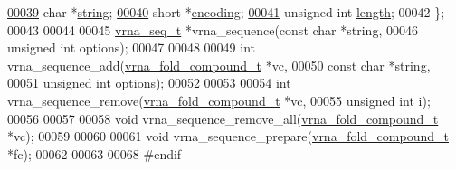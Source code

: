\begin{DoxyCode}
\hyperlink{group__alphabet__utils_aa885a2c52b3f87fb6c8f51a77a3430a7}{00039}   \textcolor{keywordtype}{char}            *\hyperlink{group__alphabet__utils_aa885a2c52b3f87fb6c8f51a77a3430a7}{string};    
\hyperlink{group__alphabet__utils_a8010ad82da6766e859e6f25e275a1d89}{00040}   \textcolor{keywordtype}{short}           *\hyperlink{group__alphabet__utils_a8010ad82da6766e859e6f25e275a1d89}{encoding};  
\hyperlink{group__alphabet__utils_af60876d93312ce0b842574a14c3a9cdd}{00041}   \textcolor{keywordtype}{unsigned} \textcolor{keywordtype}{int}    \hyperlink{group__alphabet__utils_af60876d93312ce0b842574a14c3a9cdd}{length};     
00042 \};
00043 
00044 
00045 \hyperlink{group__alphabet__utils_structvrna__sequence__s}{vrna\_seq\_t} *vrna\_sequence(\textcolor{keyword}{const} \textcolor{keywordtype}{char}    *\textcolor{keywordtype}{string},
00046                           \textcolor{keywordtype}{unsigned} \textcolor{keywordtype}{int}  options);
00047 
00048 
00049 \textcolor{keywordtype}{int}           vrna\_sequence\_add(\hyperlink{group__fold__compound_structvrna__fc__s}{vrna\_fold\_compound\_t}  *vc,
00050                                 \textcolor{keyword}{const} \textcolor{keywordtype}{char}            *\textcolor{keywordtype}{string},
00051                                 \textcolor{keywordtype}{unsigned} \textcolor{keywordtype}{int}          options);
00052 
00053 
00054 \textcolor{keywordtype}{int}           vrna\_sequence\_remove(\hyperlink{group__fold__compound_structvrna__fc__s}{vrna\_fold\_compound\_t} *vc,
00055                                    \textcolor{keywordtype}{unsigned} \textcolor{keywordtype}{int}         i);
00056 
00057 
00058 \textcolor{keywordtype}{void}          vrna\_sequence\_remove\_all(\hyperlink{group__fold__compound_structvrna__fc__s}{vrna\_fold\_compound\_t} *vc);
00059 
00060 
00061 \textcolor{keywordtype}{void}          vrna\_sequence\_prepare(\hyperlink{group__fold__compound_structvrna__fc__s}{vrna\_fold\_compound\_t} *fc);
00062 
00063 
00068 \textcolor{preprocessor}{#endif}
\end{DoxyCode}

